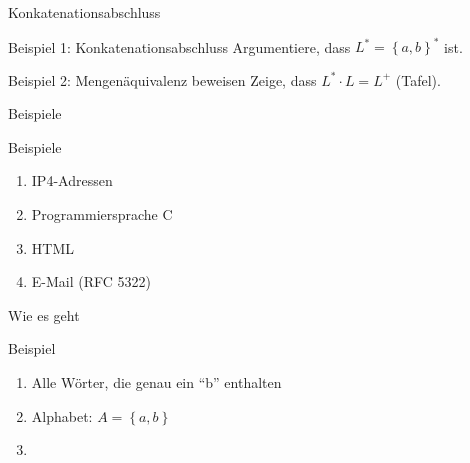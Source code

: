 \begin{frame}{Konkatenationsabschluss}
    \begin{exampleblock}{Beispiel 1: Konkatenationsabschluss}
        Argumentiere, dass $L^* = \left\{ a, b\right\}^*$ ist.
    \end{exampleblock}
    \pause
    \begin{exampleblock}{Beispiel 2: Mengenäquivalenz beweisen}
        Zeige, dass $L^* \cdot L = L^+$ (Tafel).
    \end{exampleblock}
\end{frame}

\begin{frame}{Beispiele}
    \begin{block}{Beispiele}
        \begin{enumerate}
            \item IP4-Adressen
            \item Programmiersprache C
            \item HTML
            \item E-Mail (RFC 5322)
        \end{enumerate}
    \end{block}
\end{frame}

\begin{frame}{Wie es geht}
    \begin{block}{Beispiel}
        \begin{enumerate}
            \item Alle Wörter, die genau ein "`b"' enthalten
                \pause
            \item Alphabet: $A = \left\{ a, b\right\}$
                \pause
            \item {}
        \end{enumerate}
    \end{block}
\end{frame}

